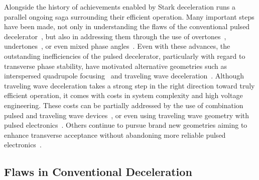 Alongside the history of achievements enabled by Stark deceleration runs a parallel ongoing saga surrounding their efficient operation. 
Many important steps have been made, not only in understanding the flaws of the conventional pulsed decelerator~\cite{VanDeMeerakker2006,Sawyer2008a}, but also in addressing them through the use of overtones~\cite{VanDeMeerakker2005a,Scharfenberg2009}, undertones~\cite{Zhang2016}, or even mixed phase angles~\cite{Parazzoli2009,Hou2013}. 
Even with these advances, the outstanding inefficiencies of the pulsed decelerator, particularly with regard to transverse phase stability, have motivated alternative geometries such as interspersed quadrupole focusing~\cite{Sawyer2008a} and traveling wave deceleration~\cite{Osterwalder2010,VandenBerg2014,Fabrikant2014}. 
Although traveling wave deceleration takes a strong step in the right direction toward truly efficient operation, it comes with costs in system complexity and high voltage engineering. 
These costs can be partially addressed by the use of combination pulsed and traveling wave devices~\cite{Quintero-Perez2013}, or even using traveling wave geometry with pulsed electronics~\cite{Hou2016,Shyur2017}. 
Others continue to pursue brand new geometries aiming to enhance transverse acceptance without abandoning more reliable pulsed electronics~\cite{Wang2016}. 

\subsection{Flaws in Conventional Deceleration}

